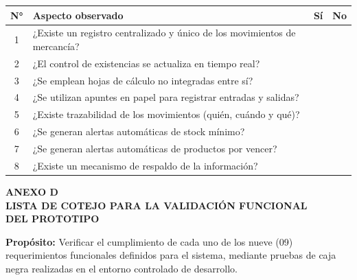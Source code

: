 \documentclass[12pt, letterpaper]{report}
\begin{document}
\noindent
\begin{tabular}{|c|p{9cm}|c|c|}
\hline
\textbf{N°} & \textbf{Aspecto observado} & \textbf{Sí} & \textbf{No} \\
\hline
1 & ¿Existe un registro centralizado y único de los movimientos de mercancía? & & \\
\hline
2 & ¿El control de existencias se actualiza en tiempo real? & & \\
\hline
3 & ¿Se emplean hojas de cálculo no integradas entre sí? & & \\
\hline
4 & ¿Se utilizan apuntes en papel para registrar entradas y salidas? & & \\
\hline
5 & ¿Existe trazabilidad de los movimientos (quién, cuándo y qué)? & & \\
\hline
6 & ¿Se generan alertas automáticas de stock mínimo? & & \\
\hline
7 & ¿Se generan alertas automáticas de productos por vencer? & & \\
\hline
8 & ¿Existe un mecanismo de respaldo de la información? & & \\
\hline
\end{tabular}

\clearpage
\begin{center}
{\fontsize{14}{16}\selectfont\bfseries
ANEXO D\\
LISTA DE COTEJO PARA LA VALIDACIÓN FUNCIONAL\\
DEL PROTOTIPO\par}
\end{center}
\vspace{12pt}

\textbf{Propósito:} Verificar el cumplimiento de cada uno de los nueve
(09) requerimientos funcionales definidos para el sistema, mediante
pruebas de caja negra realizadas en el entorno controlado de
desarrollo.

\vspace{8pt}
\end{document}
